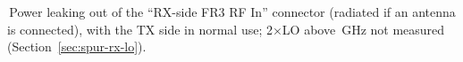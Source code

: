 {\par\noindent{}\,Power leaking out of the ``RX-side FR3 RF In'' connector (radiated if an antenna is connected), with the TX side in normal use; 2×LO above \spurTwoLoLimit\,GHz not measured (Section~\ref{sec:spur-rx-lo}). \par}%
\flushbottom
